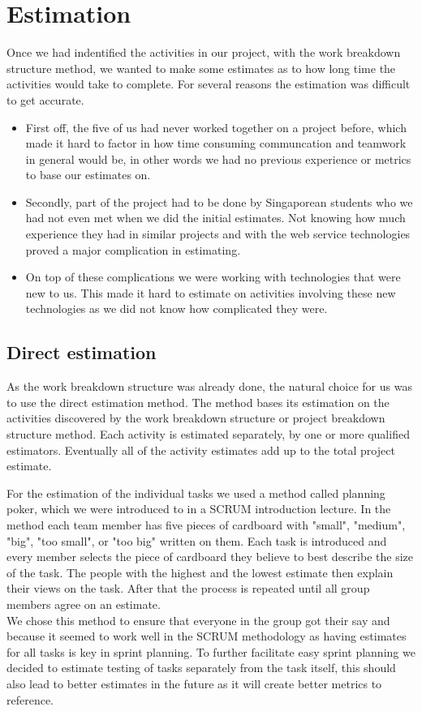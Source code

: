 \section{Estimation}
\label{sec:EmpiriEstimation}
Once we had indentified the activities in our project, with the work breakdown structure method, we wanted to make some estimates as to how long time the activities would take to complete. For several reasons the estimation was difficult to get accurate.
\begin{itemize}
\item First off, the five of us had never worked together on a project before, which made it hard to factor in how time consuming communcation and teamwork in general would be, in other words we had no previous experience or metrics to base our estimates on. 

\item Secondly, part of the project had to be done by Singaporean students who we had not even met when we did the initial estimates. Not knowing how much experience they had in similar projects and with the web service technologies proved a major complication in estimating.

\item  On top of these complications we were working with technologies that were new to us. This made it hard to estimate on activities involving these new technologies as we did not know how complicated they were.

\end{itemize}
\subsection{Direct estimation}
As the work breakdown structure was already done, the natural choice for us was to use the direct estimation method\cite{caye}. The method bases its estimation on the activities discovered by the work breakdown structure or project breakdown structure method. Each activity is  estimated separately, by one or more qualified estimators. Eventually all of the activity estimates add up to the total project estimate. 

For the estimation of the individual tasks we used a method called planning poker, which we were introduced to in a SCRUM introduction lecture. In the method each team member has five pieces of cardboard with "small", "medium", "big", "too small", or "too big" written on them. Each task is introduced and every member selects the piece of cardboard they believe to best describe the size of the task. The people with the highest and the lowest estimate then explain their views on the task. After that the process is repeated until all group members agree on an estimate. \\
We chose this method to ensure that everyone in the group got their say and because it seemed to work well in the SCRUM methodology as having estimates for all tasks is key in sprint planning. To further facilitate easy sprint planning we decided to estimate testing of tasks separately from the task itself, this should also lead to better estimates in the future as it will create better metrics to reference.

